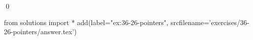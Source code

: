 
\begin{ex}
  \label{ex:36-26-pointers}
  
  \qed
\end{ex}
\begin{python0}
from solutions import *
add(label="ex:36-26-pointers",
    srcfilename='exercises/36-26-pointers/answer.tex')
\end{python0}
